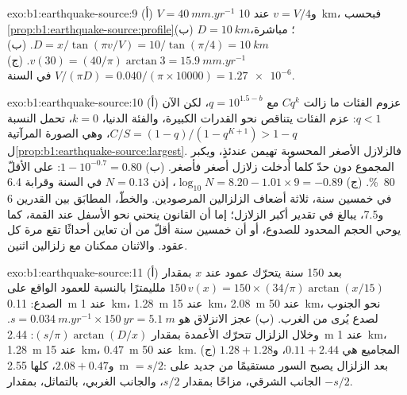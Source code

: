 \begin{solution}{exo:b1:earthquake-source:9}
(أ) $V = \qty{40}{mm.yr^{-1}}$ و$v = V/4$ عند \qty{10}{km}، فبحسب
\cref{prop:b1:earthquake-source:profile}(ب) $D = \qty{10}{km}$؛ مباشرة،
$D = x/\tan(\pi v/V) = 10/\tan(\pi/4) = \qty{10}{km}$. (ب) $v(30) =
(40/\pi)\arctan 3 = \qty{15.9}{mm.yr^{-1}}$. (ج) $V/(\pi D) =
\num{0.040}/(\pi\times\num{10000}) = \num{1.27e-6}$ في السنة.
\end{solution}

\begin{solution}{exo:b1:earthquake-source:10}
(أ) عزوم الفئات ما زالت $C q^k$ مع $q = 10^{1.5 - b}$، لكن الآن $q < 1$: عزم الفئات يتناقص نحو القدرات الكبيرة، والفئة الدنيا، $k = 0$، تحمل النسبة $C/S = (1 - q)/(1 - q^{K+1}) > 1 - q$، وهي الصورة المرآتية ل\cref{prop:b1:earthquake-source:largest}. فالزلازل الأصغر المحسوبة تهيمن عندئذٍ، ويكبر المجموع دون حدّ كلما أُدخلت زلازل أصغر فأصغر. (ب) $1 - 10^{-0.7} = 0.80$: على الأقلّ \qty{80}{\percent}. (ج) $\log_{10}N = 8.20 - 1.01\times9 = -0.89$، إذن $N = 0.13$
في السنة وقرابة 6.4 في خمسين سنة، ثلاثة أضعاف الزلزالين المرصودين. والخطّ، المطابَق بين القدرين 6 و\num{7.5}، يبالغ في تقدير أكبر الزلازل؛ إما أن القانون ينحني نحو الأسفل عند القمة، كما يوحي الحجم المحدود للصدوع، أو أن خمسين سنة أقلّ من أن تعاين أحداثًا تقع مرة كل عقود. والاثنان ممكنان مع زلزالين اثنين.
\end{solution}

\begin{solution}{exo:b1:earthquake-source:11}
(أ) بعد 150 سنة يتحرّك عمود عند $x$ بمقدار $150\,v(x) = 150\times(34/\pi)
\arctan(x/15)$ ملليمترًا بالنسبة للعمود الواقع على الصدع: \qty{0.11}{m} عند
\qty{1}{km}، \qty{1.28}{m} عند \qty{15}{km}، \qty{2.08}{m} عند \qty{50}{km}،
نحو الجنوب لصدع  يُرى من الغرب. (ب) عجز الانزلاق هو
$s = \qty{0.034}{m.yr^{-1}}\times\qty{150}{yr} = \qty{5.1}{m}$. وخلال
الزلزال تتحرّك الأعمدة بمقدار $(s/\pi)\arctan(D/x)$: \qty{2.44}{m} عند
\qty{1}{km}، \qty{1.28}{m} عند \qty{15}{km}، \qty{0.47}{m} عند \qty{50}{km}.
(ج) المجاميع هي $0.11 + 2.44$، و$1.28 + 1.28$ و$2.08 + 0.47$، كلها
\qty{2.55}{m} $= s/2$: بعد الزلزال يصبح السور مستقيمًا من جديد على الجانب الشرقي، مزاحًا بمقدار $s/2$، والجانب الغربي، بالتماثل، بمقدار $-s/2$.
\end{solution}

